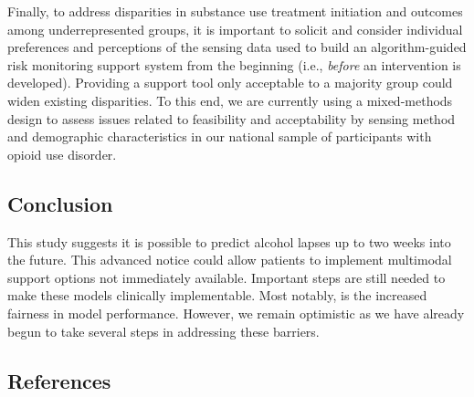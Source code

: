 \documentclass[
]{agujournal2019}
\begin{document}
Finally, to address disparities in substance use treatment initiation
and outcomes among underrepresented groups, it is important to solicit
and consider individual preferences and perceptions of the sensing data
used to build an algorithm-guided risk monitoring support system from
the beginning (i.e., \emph{before} an intervention is developed).
Providing a support tool only acceptable to a majority group could widen
existing disparities. To this end, we are currently using a
mixed-methods design to assess issues related to feasibility and
acceptability by sensing method and demographic characteristics in our
national sample of participants with opioid use disorder.

\subsection{Conclusion}\label{conclusion}

This study suggests it is possible to predict alcohol lapses up to two
weeks into the future. This advanced notice could allow patients to
implement multimodal support options not immediately available.
Important steps are still needed to make these models clinically
implementable. Most notably, is the increased fairness in model
performance. However, we remain optimistic as we have already begun to
take several steps in addressing these barriers.

\subsection{References}\label{references}
\end{document}
